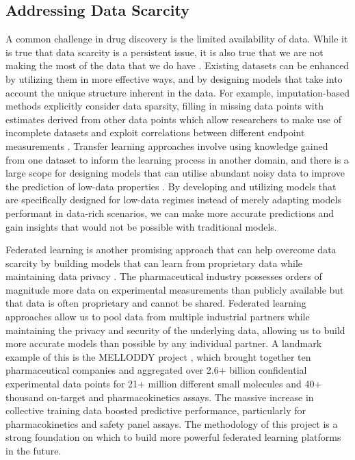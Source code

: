 \subsection{Addressing Data Scarcity}
A common challenge in drug discovery is the limited availability of data. While it is true that data scarcity is a persistent issue, it is also true that we are not making the most of the data that we do have \cite{Bender2021part2}. Existing datasets can be enhanced by utilizing them in more effective ways, and by designing models that take into account the unique structure inherent in the data. For example, imputation-based methods explicitly consider data sparsity, filling in missing data points with estimates derived from other data points which allow researchers to make use of incomplete datasets and exploit correlations between different endpoint measurements \cite{Irwin2020Imputation, Irwin2021Imputation, Tse2021OpenMalaria}. Transfer learning approaches involve using knowledge gained from one dataset to inform the learning process in another domain, and there is a large scope for designing models that can utilise abundant noisy data to improve the prediction of low-data properties \cite{Wenzel2019ADMETox, Obrezanova2022InVivo}. By developing and utilizing models that are specifically designed for low-data regimes instead of merely adapting models performant in data-rich scenarios, we can make more accurate predictions and gain insights that would not be possible with traditional models.

Federated learning is another promising approach that can help overcome data scarcity by building models that can learn from proprietary data while maintaining data privacy \cite{Li2020FedLearning}. The pharmaceutical industry possesses orders of magnitude more data on experimental measurements than publicly available but that data is often proprietary and cannot be shared. Federated learning approaches allow us to pool data from multiple industrial partners while maintaining the privacy and security of the underlying data, allowing us to build more accurate models than possible by any individual partner. A landmark example of this is the MELLODDY project \cite{Wouter2022Melloddy, Oldenhof2022Melloddy}, which brought together ten pharmaceutical companies and aggregated over 2.6+ billion confidential experimental data points for 21+ million different small molecules and 40+ thousand on-target and pharmacokinetics assays. The massive increase in collective training data boosted predictive performance, particularly for pharmacokinetics and safety panel assays. The methodology of this project is a strong foundation on which to build more powerful federated learning platforms in the future.

